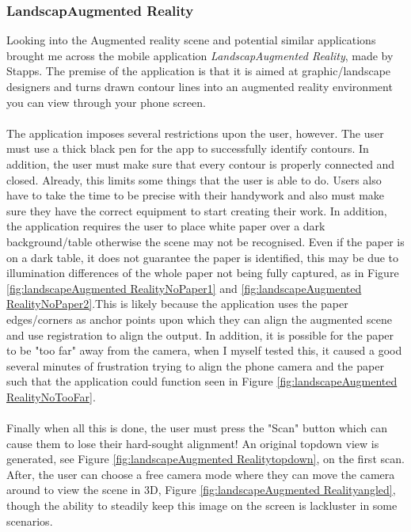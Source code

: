 \documentclass[11pt]{article}
\begin{document}
\subsubsection{LandscapAugmented Reality}
\label{LandscapAugmented Reality}
Looking into the Augmented reality scene and potential similar
applications brought me across the mobile application \textit{LandscapAugmented Reality},
made by Stapps. The premise of the application is that it is aimed at
graphic/landscape designers and turns drawn contour lines into an augmented
reality environment you can view through your phone screen. \\
\\
The application imposes several restrictions upon the user, however. The user
must use a thick black pen for the app to successfully identify contours. 
In addition, the user must make sure that every contour is properly connected
and closed. Already, this limits some things that the user is able to do.
Users also have to take the time to be precise with their handywork and also 
must make sure they have the 
correct equipment to start creating their work. In addition, the application
requires the user to place white paper over a dark background/table otherwise
the scene may not be recognised. Even if the paper is on a dark table, it 
does not guarantee the paper is identified, this may be due to illumination
differences of the whole paper not being fully captured, as in 
Figure \ref{fig:landscapeAugmented RealityNoPaper1} and \ref{fig:landscapeAugmented RealityNoPaper2}.This 
is likely because the application uses 
the paper edges/corners as anchor points upon which they can align the 
augmented scene and use registration to align the output. In addition, it
is possible for the paper to be "too far" away from the camera, when I
myself tested this, it caused a good several minutes of frustration trying
to align the phone camera and the paper such that the application could 
function seen in Figure \ref{fig:landscapeAugmented RealityNoTooFar}.\\
\\ 
Finally when all this is done, the user must press the "Scan" button
which can cause them to lose their hard-sought alignment! An original
topdown view is generated, see Figure \ref{fig:landscapeAugmented Realitytopdown}, on
the first scan. After, the user can choose a free camera mode where they 
can move the camera around to view the scene in 3D, 
Figure \ref{fig:landscapeAugmented Realityangled}, though the ability to steadily
keep this image on the screen is lackluster in some scenarios.  \\
\end{document}
